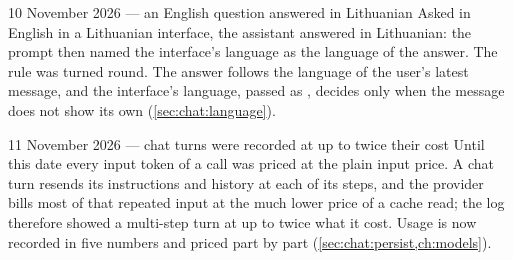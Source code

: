 \begin{lessonbox}{10 November 2026 --- an English question answered in Lithuanian}
Asked in English in a Lithuanian interface, the assistant answered in Lithuanian: the prompt
then named the interface's language as the language of the answer. The rule was turned round.
The answer follows the language of the user's latest message, and the interface's language,
passed as , decides only when the message does not show its own
(\cref{sec:chat:language}).
\end{lessonbox}

\begin{lessonbox}{11 November 2026 --- chat turns were recorded at up to twice their cost}
Until this date every input token of a call was priced at the plain input price. A chat turn
resends its instructions and history at each of its steps, and the provider bills most of
that repeated input at the much lower price of a cache read; the log therefore showed a
multi-step turn at up to twice what it cost. Usage is now recorded in five numbers and priced
part by part
(\cref{sec:chat:persist,ch:models}).
\end{lessonbox}
